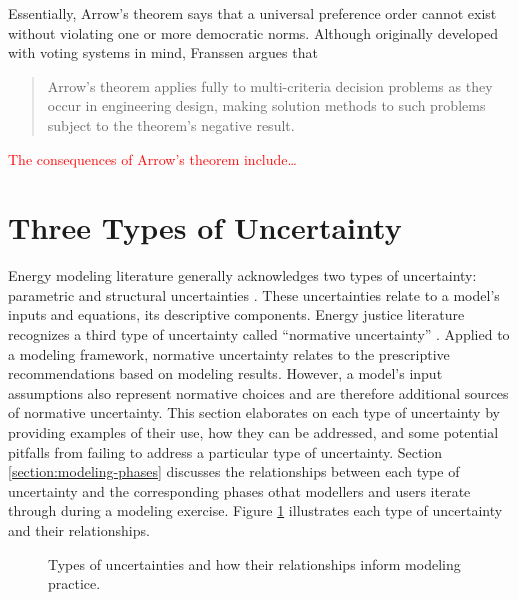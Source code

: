 Essentially, Arrow's theorem says that a universal preference order cannot exist
without violating one or more democratic norms. Although originally developed
with voting systems in mind, Franssen argues that \blockcquote[p.
42]{franssen_arrows_2005}{Arrow’s theorem applies fully to multi-criteria
decision problems as they occur in engineering design, making solution methods
to such problems subject to the theorem’s negative result.} \textcolor{red}{The
consequences of Arrow's theorem include\dots}

\section{Three Types of Uncertainty}
\label{section:triple-uncertainty}

Energy modeling literature generally acknowledges two types of uncertainty:
parametric and structural uncertainties
\cite{yue_review_2018,decarolis_modelling_2016,price_modelling_2017,
feng_sensitivity_2020}. These uncertainties relate to a model's inputs and
equations, its descriptive components. Energy justice literature recognizes a
third type of uncertainty called ``normative uncertainty''
\cite{taebi_governing_2020, van_uffelen_revisiting_2024}. Applied to a modeling
framework, normative uncertainty relates to the prescriptive recommendations
based on modeling results. However, a model's input assumptions also represent
normative choices and are therefore additional sources of normative uncertainty.
This section elaborates on each type of uncertainty by providing examples of
their use, how they can be addressed, and some potential pitfalls from failing
to address a particular type of uncertainty. Section
\ref{section:modeling-phases} discusses the relationships between each type of
uncertainty and the corresponding phases othat modellers and users iterate
through during a modeling exercise. Figure \ref{fig:triarchic-uncertainty}
illustrates each type of uncertainty and their relationships.

\begin{figure}[ht!]
    \centering
    
    \caption{Types of uncertainties and how their relationships inform modeling practice.}
    \label{fig:triarchic-uncertainty}
\end{figure}

